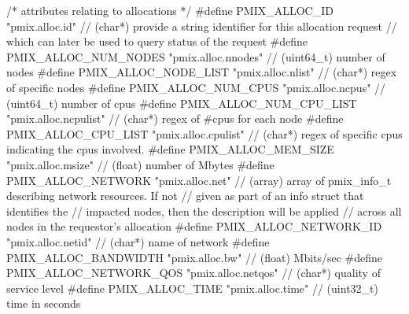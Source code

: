 \begin{codepar}
/* attributes relating to allocations */
#define PMIX_ALLOC_ID                       "pmix.alloc.id"         // (char*) provide a string identifier for this allocation request
                                                                    //         which can later be used to query status of the request
#define PMIX_ALLOC_NUM_NODES                "pmix.alloc.nnodes"     // (uint64_t) number of nodes
#define PMIX_ALLOC_NODE_LIST                "pmix.alloc.nlist"      // (char*) regex of specific nodes
#define PMIX_ALLOC_NUM_CPUS                 "pmix.alloc.ncpus"      // (uint64_t) number of cpus
#define PMIX_ALLOC_NUM_CPU_LIST             "pmix.alloc.ncpulist"   // (char*) regex of #cpus for each node
#define PMIX_ALLOC_CPU_LIST                 "pmix.alloc.cpulist"    // (char*) regex of specific cpus indicating the cpus involved.
#define PMIX_ALLOC_MEM_SIZE                 "pmix.alloc.msize"      // (float) number of Mbytes
#define PMIX_ALLOC_NETWORK                  "pmix.alloc.net"        // (array) array of pmix_info_t describing network resources. If not
                                                                    //         given as part of an info struct that identifies the
                                                                    //         impacted nodes, then the description will be applied
                                                                    //         across all nodes in the requestor's allocation
#define PMIX_ALLOC_NETWORK_ID               "pmix.alloc.netid"      // (char*) name of network
#define PMIX_ALLOC_BANDWIDTH                "pmix.alloc.bw"         // (float) Mbits/sec
#define PMIX_ALLOC_NETWORK_QOS              "pmix.alloc.netqos"     // (char*) quality of service level
#define PMIX_ALLOC_TIME                     "pmix.alloc.time"       // (uint32_t) time in seconds


\end{codepar}
